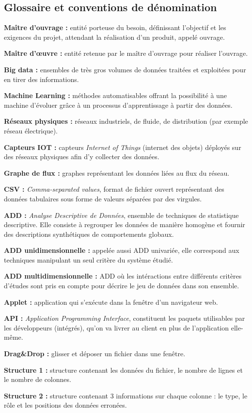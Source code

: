		\subsection{Glossaire et conventions de dénomination}
			\begin{description}[style=unboxed,leftmargin=0.2cm]
				\item\textbf{Maître d'ouvrage :} entité porteuse du besoin, définissant l'objectif et les exigences du projet, attendant la réalisation d'un produit, appelé ouvrage.
				\item\textbf{Maître d'œuvre :} entité retenue par le maître d'ouvrage pour réaliser l'ouvrage.
				\item\textbf{Big data :} ensembles de très gros volumes de données traitées et exploitées pour en tirer des informations.
				\item\textbf{Machine Learning :} méthodes automatisables offrant la possibilité à une machine d'évoluer grâce à un processus d'apprentissage à partir des données.
				\item\textbf{Réseaux physiques :} réseaux industriels, de fluide, de distribution (par exemple réseau électrique).
				\item\textbf{Capteurs IOT :} capteurs \textit{Internet of Things} (internet des objets) déployés sur des réseaux physiques afin d'y collecter des données.
				\item\textbf{Graphe de flux :} graphes représentant les données liées au flux du réseau.
				\item\textbf{CSV :} \textit{Comma-separated values}, format de fichier ouvert représentant des données tabulaires sous forme de valeurs séparées par des virgules.
				\item\textbf{ADD :} \textit{Analyse Descriptive de Données}, ensemble de techniques de statistique descriptive. Elle consiste à regrouper les données de manière homogène et fournir des descriptions synthétiques de comportements globaux.
				\item\textbf{ADD unidimensionnelle :} appelée aussi ADD univariée, elle correspond aux techniques manipulant un seul critère du système étudié.
				\item\textbf{ADD multidimensionnelle :} ADD où les intéractions entre différents critères d'études sont pris en compte pour décrire le jeu de données dans son ensemble.
				\item\textbf{Applet :} application qui s'exécute dans la fenêtre d'un navigateur web.
				\item\textbf{API :} \textit{Application Programming Interface}, constituent les paquets utilisables par les développeurs (intégrés), qu'on va livrer au client en plus de l'application elle-même.
				\item\textbf{Drag\&Drop :} glisser et déposer un fichier dans une fenêtre.
				\item\textbf{Structure 1 :} structure contenant les données du fichier, le nombre de lignes et le nombre de colonnes.
				\item\textbf{Structure 2 :} structure contenant 3 informations sur chaque colonne : le type, le rôle et les positions des données erronées.
			\end{description}
			
